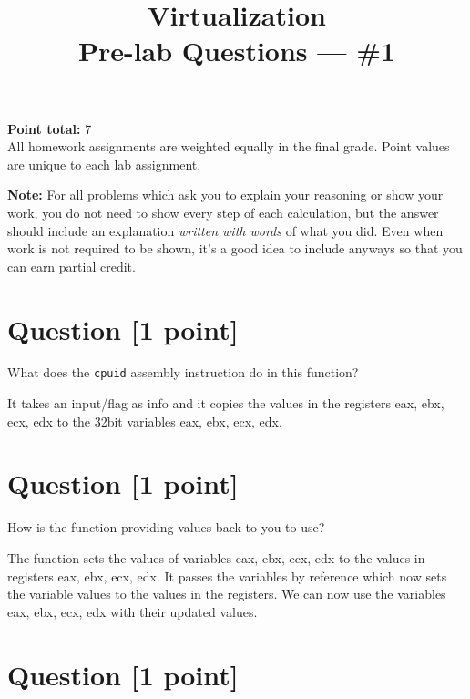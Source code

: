 \documentclass[11pt]{article}
\providecommand{\due}{}
\begin{document}
\title{Virtualization\\Pre-lab Questions --- \#1}
\date{\due}

\maketitle

\noindent \textbf{Point total:} 7
\\ All homework assignments are weighted equally in the final grade. Point values are unique to each lab assignment.

\textbf{Note:} For all problems which ask you to explain your reasoning or show your work, you do not need to show every step of each calculation, but the answer should include an explanation \emph{written with words} of what you did.  Even when work is not required to be shown, it’s a good idea to include anyways so that you can earn partial credit.

\section{Question [1 point]}

What does the \texttt{cpuid} assembly instruction do in this function?

\begin{solution}
It takes an input/flag as info and it copies the values in the registers eax, ebx, ecx, edx to the 32bit variables eax, ebx, ecx, edx.
\end{solution}


\section{Question [1 point]}

How is the function providing values back to you to use?

\begin{solution}
The function sets the values of variables eax, ebx, ecx, edx to the values in registers eax, ebx, ecx, edx. It passes the variables by reference which now sets the variable values to the values in the registers.  We can now use the variables eax, ebx, ecx, edx with their updated values.
\end{solution}


\section{Question [1 point]}
\end{document}

